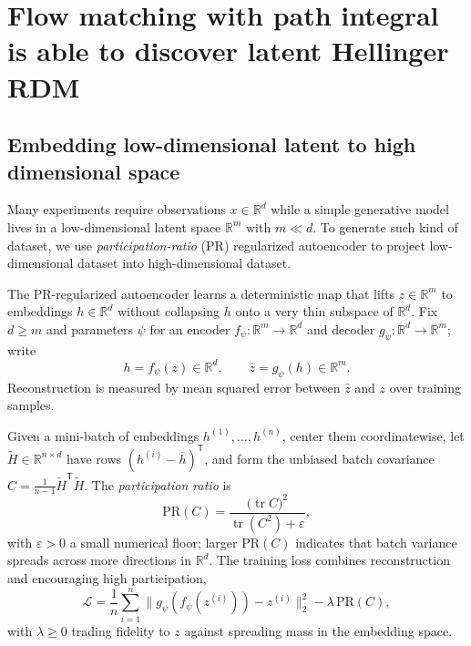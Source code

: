 \section{Flow matching with path integral is able to discover latent Hellinger RDM}

\subsection{Embedding low-dimensional latent to high dimensional space}

Many experiments require observations $x \in \mathbb{R}^{d}$ while a simple generative model lives in a low-dimensional latent space $\mathbb{R}^{m}$ with $m \ll d$. To generate such kind of dataset, we use \emph{participation-ratio} (PR) regularized autoencoder to project low-dimensional dataset into high-dimensional dataset.

The PR-regularized autoencoder learns a deterministic map that lifts $z \in \mathbb{R}^{m}$ to embeddings $h \in \mathbb{R}^{d}$ without collapsing $h$ onto a very thin subspace of $\mathbb{R}^{d}$.
Fix $d \ge m$ and parameters $\psi$ for an encoder $f_{\psi}:\mathbb{R}^{m}\to\mathbb{R}^{d}$ and decoder $g_{\psi}:\mathbb{R}^{d}\to\mathbb{R}^{m}$; write
\begin{equation}
  h = f_{\psi}(z) \in \mathbb{R}^{d},
  \qquad
  \hat{z} = g_{\psi}(h) \in \mathbb{R}^{m}.
\end{equation}
Reconstruction is measured by mean squared error between $\hat{z}$ and $z$ over training samples.

Given a mini-batch of embeddings $h^{(1)},\ldots,h^{(n)}$, center them coordinatewise, let $\tilde{H}\in\mathbb{R}^{n\times d}$ have rows $(h^{(i)} - \bar{h})^{\mathsf{T}}$, and form the unbiased batch covariance $C = \frac{1}{n-1}\tilde{H}^{\mathsf{T}}\tilde{H}$.
The \emph{participation ratio} is
\begin{equation}
  \label{eq:pr-def}
  \mathrm{PR}(C) = \frac{\bigl(\operatorname{tr} C\bigr)^{2}}{\operatorname{tr}(C^{2}) + \varepsilon},
\end{equation}
with $\varepsilon>0$ a small numerical floor; larger $\mathrm{PR}(C)$ indicates that batch variance spreads across more directions in $\mathbb{R}^{d}$.
The training loss combines reconstruction and encouraging high participation,
\begin{equation}
  \label{eq:pr-loss}
  \mathcal{L}
  =
  \frac{1}{n}\sum_{i=1}^{n} \bigl\lVert g_{\psi}(f_{\psi}(z^{(i)})) - z^{(i)} \bigr\rVert_{2}^{2}
  - \lambda\,\mathrm{PR}(C),
\end{equation}
with $\lambda \ge 0$ trading fidelity to $z$ against spreading mass in the embedding space.

